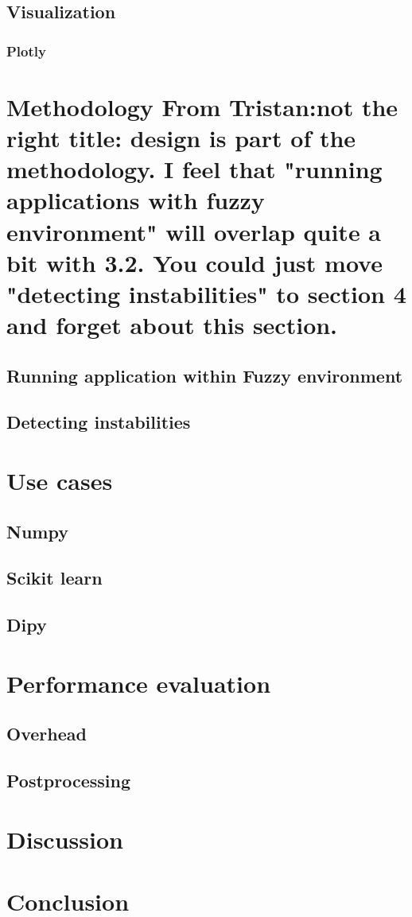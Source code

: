 \documentclass{article}
\newcommand{\tristan}[1]{\color{orange}\textbf{From Tristan:}#1\color{black}}
\begin{document}
\subsection{Visualization}

\subsubsection{Plotly}


\section{Methodology \tristan{not the right title: design is part of the methodology. I feel that "running applications with fuzzy environment" will overlap quite a  bit with 3.2. You could just move "detecting instabilities" to section 4 and forget about this section.}}
\subsection{Running application within Fuzzy environment}
\subsection{Detecting instabilities}


\section{Use cases}

\subsection{Numpy}
\subsection{Scikit learn}
\subsection{Dipy}

\section{Performance evaluation}
\subsection{Overhead}
\subsection{Postprocessing}

\section{Discussion}

\section{Conclusion}



\end{document}

